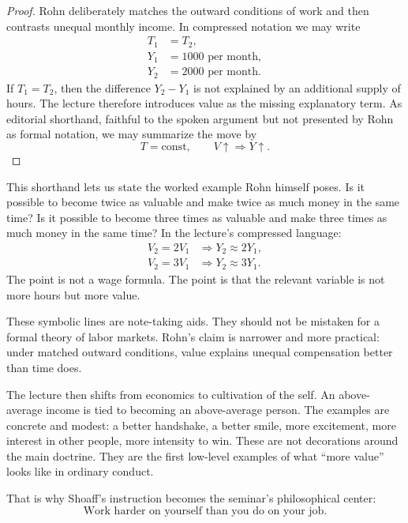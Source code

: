 \begin{proof}
Rohn deliberately matches the outward conditions of work and then contrasts unequal monthly income. In compressed notation we may write
\begin{align}
T_1 &= T_2,\\
Y_1 &= 1000 \text{ per month},\\
Y_2 &= 2000 \text{ per month}.
\end{align}
If \(T_1=T_2\), then the difference \(Y_2-Y_1\) is not explained by an additional supply of hours. The lecture therefore introduces value as the missing explanatory term. As editorial shorthand, faithful to the spoken argument but not presented by Rohn as formal notation, we may summarize the move by
\begin{equation}
T=\text{const},\qquad V\uparrow \Rightarrow Y\uparrow.
\end{equation}
\end{proof}

This shorthand lets us state the worked example Rohn himself poses. Is it possible to become twice as valuable and make twice as much money in the same time? Is it possible to become three times as valuable and make three times as much money in the same time? In the lecture's compressed language:
\begin{align}
V_2 = 2V_1 &\Rightarrow Y_2 \approx 2Y_1,\\
V_2 = 3V_1 &\Rightarrow Y_2 \approx 3Y_1.
\end{align}
The point is not a wage formula. The point is that the relevant variable is not more hours but more value.

\begin{remark}
These symbolic lines are note-taking aids. They should not be mistaken for a formal theory of labor markets. Rohn's claim is narrower and more practical: under matched outward conditions, value explains unequal compensation better than time does.
\end{remark}

The lecture then shifts from economics to cultivation of the self. An above-average income is tied to becoming an above-average person. The examples are concrete and modest: a better handshake, a better smile, more excitement, more interest in other people, more intensity to win. These are not decorations around the main doctrine. They are the first low-level examples of what ``more value'' looks like in ordinary conduct.

That is why Shoaff's instruction becomes the seminar's philosophical center:
\begin{equation}
\text{Work harder on yourself than you do on your job.}
\end{equation}

